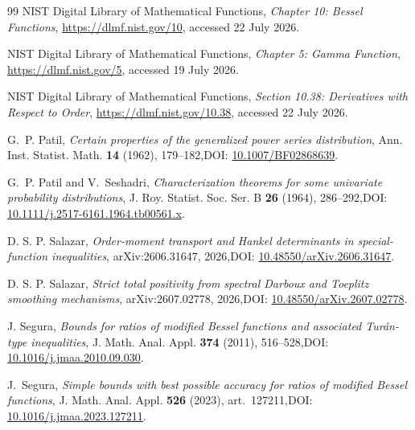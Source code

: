 \documentclass[11pt,a4paper]{amsart}
\numberwithin{equation}{section}
\theoremstyle{plain}
\theoremstyle{definition}
\begin{document}
\begin{thebibliography}{99}
NIST Digital Library of Mathematical Functions,
\emph{Chapter 10: Bessel Functions},
\url{https://dlmf.nist.gov/10}, accessed 22 July 2026.

NIST Digital Library of Mathematical Functions,
\emph{Chapter 5: Gamma Function},
\url{https://dlmf.nist.gov/5}, accessed 19 July 2026.

NIST Digital Library of Mathematical Functions,
\emph{Section 10.38: Derivatives with Respect to Order},
\url{https://dlmf.nist.gov/10.38}, accessed 22 July 2026.

G.~P. Patil,
\emph{Certain properties of the generalized power series distribution},
Ann. Inst. Statist. Math. \textbf{14} (1962), 179--182,\newline DOI: \href{https://doi.org/10.1007/BF02868639}{10.1007/BF02868639}.

G.~P. Patil and V.~Seshadri,
\emph{Characterization theorems for some univariate probability distributions},
J. Roy. Statist. Soc. Ser. B \textbf{26} (1964), 286--292,\newline DOI: \href{https://doi.org/10.1111/j.2517-6161.1964.tb00561.x}{10.1111/j.2517-6161.1964.tb00561.x}.

D. S. P. Salazar,
\emph{Order-moment transport and Hankel determinants in special-function inequalities},
arXiv:2606.31647, 2026,\newline DOI: \href{https://doi.org/10.48550/arXiv.2606.31647}{10.48550/arXiv.2606.31647}.

D. S. P. Salazar,
\emph{Strict total positivity from spectral Darboux and Toeplitz smoothing mechanisms},
arXiv:2607.02778, 2026,\newline DOI: \href{https://doi.org/10.48550/arXiv.2607.02778}{10.48550/arXiv.2607.02778}.

J. Segura,
\emph{Bounds for ratios of modified Bessel functions and associated Tur\'{a}n-type inequalities},
J. Math. Anal. Appl. \textbf{374} (2011), 516--528,\newline DOI: \href{https://doi.org/10.1016/j.jmaa.2010.09.030}{10.1016/j.jmaa.2010.09.030}.


J.~Segura,
\emph{Simple bounds with best possible accuracy for ratios of modified Bessel functions},
J. Math. Anal. Appl. \textbf{526} (2023), art.~127211,\newline DOI: \href{https://doi.org/10.1016/j.jmaa.2023.127211}{10.1016/j.jmaa.2023.127211}.


\end{thebibliography}
\end{document}
